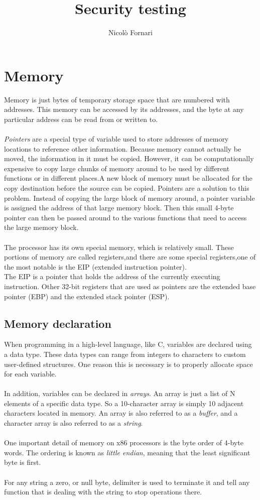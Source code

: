 \documentclass[10pt,a4paper]{book}
\author{Nicolò Fornari}
\title{Security testing}
\begin{document}
\chapter{Memory}
Memory is just bytes of temporary storage space that are numbered with addresses. This memory can be accessed by its addresses, and the byte at any particular address can be read from or written to.\\\\
\emph{Pointers} are a special type of variable used to store addresses of memory locations to reference other information.
Because memory cannot actually be moved, the information in it must be copied. However, it can be computationally
expensive to copy large chunks of memory around to be used by different functions or in different places.A new block of memory must be allocated for the copy destination before the source can be copied. Pointers are a solution to this problem. Instead of copying the large block of memory around, a pointer variable is assigned the address of that large memory block. Then this small 4-byte pointer
can then be passed around to the various functions that need to access the large memory block.\\\\
The processor has its own special memory, which is relatively small. These portions of memory are called registers,and there are some special registers,one of the most notable is the EIP (extended instruction pointer).\\
The EIP is a pointer that holds the address of the currently executing
instruction. Other 32-bit registers that are used as pointers are the extended base pointer (EBP) and the extended stack pointer (ESP).
\section{Memory declaration}
When programming in a high-level language, like C, variables are declared using a data type. These data types can range from integers to characters to custom user-defined structures. One reason this is necessary is to properly allocate space for each variable.\\\\
In addition, variables can be declared in \emph{arrays}. An array is just a list of N elements of a specific data type. So a
10-character array is simply 10 adjacent characters located in memory. An array is also referred to as a \emph{buffer}, and a character array is also referred to as a \emph{string}.\\\\
One important detail of memory on x86 processors is the byte order of 4-byte words. The ordering is known as \emph{little endian}, meaning that the least significant byte is first.\\\\
For any string a zero, or null byte, delimiter is used to terminate it and tell any function that is dealing with the string to stop operations there.
\end{document}
